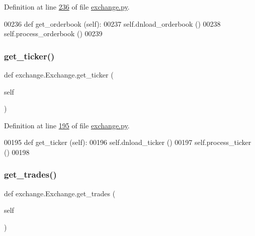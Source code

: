 Definition at line \hyperlink{exchange_8py_source_l00236}{236} of file \hyperlink{exchange_8py_source}{exchange.\+py}.


\begin{DoxyCode}
00236     \textcolor{keyword}{def }get\_orderbook (self):
00237         self.dnload\_orderbook ()
00238         self.process\_orderbook () 
00239     
\end{DoxyCode}
\mbox{\label{classexchange_1_1_exchange_aabe7d5679cac0096bc54169cfceea536}} 
\subsubsection{\texorpdfstring{get\+\_\+ticker()}{get\_ticker()}}
{\footnotesize\ttfamily def exchange.\+Exchange.\+get\+\_\+ticker (\begin{DoxyParamCaption}\item[{}]{self }\end{DoxyParamCaption})}



Definition at line \hyperlink{exchange_8py_source_l00195}{195} of file \hyperlink{exchange_8py_source}{exchange.\+py}.


\begin{DoxyCode}
00195     \textcolor{keyword}{def }get\_ticker (self):
00196         self.dnload\_ticker ()
00197         self.process\_ticker ()
00198     
\end{DoxyCode}
\mbox{\label{classexchange_1_1_exchange_a254bac1703de55674f5ebfbb03a95e74}} 
\subsubsection{\texorpdfstring{get\+\_\+trades()}{get\_trades()}}
{\footnotesize\ttfamily def exchange.\+Exchange.\+get\+\_\+trades (\begin{DoxyParamCaption}\item[{}]{self }\end{DoxyParamCaption})}



